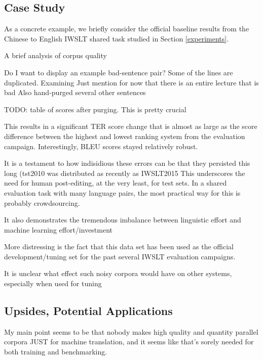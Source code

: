\subsection{Case Study}
\label{case_study}

As a concrete example, we briefly consider the official baseline results from the Chinese to English IWSLT shared task studied in Section \ref{experiments}.





A brief analysis of corpus quality


Do I want to display an example bad-sentence pair? 
Some of the lines are duplicated. Examining 
Just mention for now that there is an entire lecture that is bad
Also hand-purged several other sentences

TODO: table of scores after purging. This is pretty crucial

This results in a significant TER score change that is almost as large as the score difference between the highest and lowest ranking system from the evaluation campaign.  
Interestingly, BLEU scores stayed relatively robust.

It is a testament to how indisidious these errors can be that they persisted this long (tst2010 was distributed as recently as IWSLT2015
This underscores the need for human post-editing, at the very least, for test sets.
In a shared evaluation task with many language pairs, the most practical way for this is probably crowdsourcing.

It also demonstrates the tremendous imbalance between linguistic effort and machine learning effort/investment

More distressing is the fact that this data set has been used as the official development/tuning set for the past several IWSLT evaluation campaigns.

It is unclear what effect such noisy corpora would have on other systems, 
especially when used for tuning


\subsection{Upsides, Potential Applications}


My main point seems to be that nobody makes high quality and quantity parallel corpora JUST for machine translation, and it seems like that's sorely needed for both training and benchmarking.

